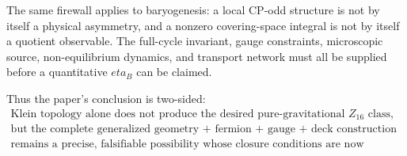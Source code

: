 \documentclass[11pt]{article}
\theoremstyle{canonmath}
\theoremstyle{canonpostulate}
\theoremstyle{canonclaim}
\def\mathbb#1{#1}%
\def\eta{eta}%
\begin{document}
The same firewall applies to baryogenesis: a local CP-odd structure is not by itself a physical asymmetry, and a nonzero covering-space integral is not by itself a quotient observable. The full-cycle invariant, gauge constraints, microscopic source, non-equilibrium dynamics, and transport network must all be supplied before a quantitative $\eta_B$ can be claimed.

Thus the paper's conclusion is two-sided:
\begin{equation*}
\boxed{\begin{gathered}
\text{Klein topology alone does not produce the desired pure-gravitational $\mathbb Z_{16}$ class,}\\
\text{but the complete generalized geometry + fermion + gauge + deck construction}\\
\text{remains a precise, falsifiable possibility whose closure conditions are now explicit.}
\end{gathered}}
\end{equation*}
\end{document}
